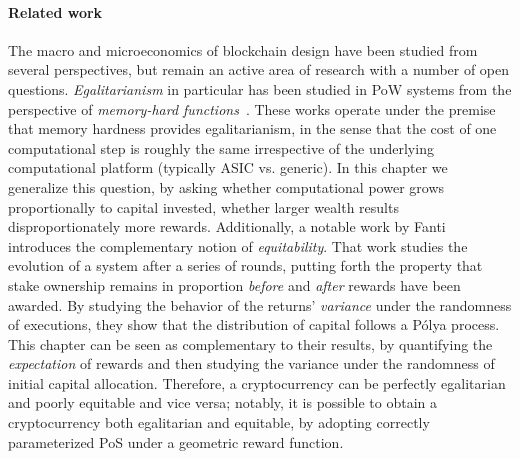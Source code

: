 \paragraph{Related work}
The macro and microeconomics of blockchain design have been studied from
several perspectives, but remain an active area of research with a number of
open questions. \emph{Egalitarianism} in particular has been studied in PoW
systems from the perspective of \emph{memory-hard
functions}~\cite{EC:AlwBloPie17,USENIX:BirKho16}. These works operate under the
premise that memory hardness provides egalitarianism, in the sense that the
cost of one computational step is roughly the same irrespective of the
underlying computational platform (typically ASIC vs. generic). In this chapter
we generalize this question, by asking whether computational power grows
proportionally to capital invested, \ie whether larger wealth results
disproportionately more rewards. Additionally, a notable work by Fanti
\etal~\cite{FC:FKORVW19} introduces the complementary notion of
\emph{equitability}.  That work studies the evolution of a system after a
series of rounds, putting forth the property that stake ownership remains in
proportion \emph{before} and \emph{after} rewards have been awarded. By
studying the behavior of the returns' \emph{variance} under the randomness of
executions, they show that the distribution of capital follows a Pólya process.
This chapter can be seen as complementary to their results, by quantifying the
\emph{expectation} of rewards and then studying the variance under the
randomness of initial capital allocation. Therefore, a cryptocurrency can be
perfectly egalitarian and poorly equitable and vice versa; notably, it is
possible to obtain a cryptocurrency both egalitarian and equitable, by adopting
correctly parameterized PoS under a geometric reward function.
